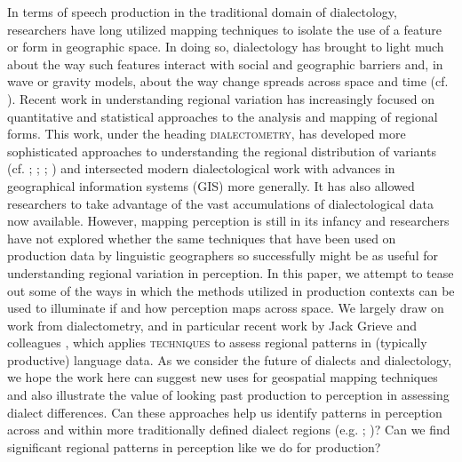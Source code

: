 \documentclass[output=paper]{LSP/langsci}
\begin{document}
In terms of speech production in the traditional domain of dialectology, researchers have long utilized mapping techniques to isolate the use of a feature or form in geographic space. In doing so, dialectology has brought to light much about the way such features interact with social and geographic barriers and, in wave or gravity models, about the way change spreads across space and time (cf. \citealt{chambers_dialectology_1998}). Recent work in understanding regional variation has increasingly focused on quantitative and statistical approaches to the analysis and mapping of regional forms. This work, under the heading \textsc{dialectometry}, has developed more sophisticated approaches to understanding the regional distribution of variants (cf. \citealt{lee_spatial_1993}; \citealt{nerbonne_introducing_2003}; \citealt{nerbonne_data-driven_2009}; \citealt{szmrecsanyi_grammatical_2012}) and intersected modern dialectological work with advances in geographical information systems (GIS) more generally. It has also allowed researchers to take advantage of the vast accumulations of dialectological data now available. However, mapping perception is still in its infancy and researchers have not explored whether the same techniques that have been used on production data by linguistic geographers so successfully might be as useful for understanding regional variation in perception.   
In this paper, we attempt to tease out some of the ways in which the methods utilized in production contexts can be used to illuminate if and how perception maps across space. We largely draw on work from dialectometry, and in particular recent work by Jack Grieve and colleagues \citep{grieve_corpus-based_2009,grieve_statistical_2011,grieve_multivariate_2013}, which applies \textsc{} \textsc{techniques} to assess regional patterns in (typically productive) language data. As we consider the future of dialects and dialectology, we hope the work here can suggest new uses for geospatial mapping techniques and also illustrate the value of looking past production to perception in assessing dialect differences. Can these approaches help us identify patterns in perception across and within more traditionally defined dialect regions (e.g. \citealt{carver_american_1987}; \citealt{labov_atlas_2006-1})? Can we find significant regional patterns in perception like we do for production?
\end{document}
